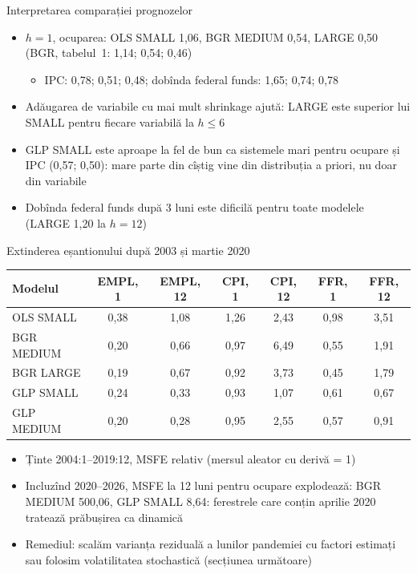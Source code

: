 \begin{frame}{Interpretarea comparației prognozelor}
\itemsize{\small}
\begin{itemize}
    \item $h = 1$, ocuparea: OLS SMALL 1{,}06, BGR MEDIUM 0{,}54, LARGE 0{,}50 (BGR, tabelul~1: 1,14; 0,54; 0,46)
    \begin{itemize}
        \item IPC: 0{,}78; 0{,}51; 0{,}48; dobînda federal funds: 1{,}65; 0{,}74; 0{,}78
    \end{itemize}
    \item Adăugarea de variabile cu mai mult shrinkage ajută: LARGE este superior lui SMALL pentru fiecare variabilă la $h \le 6$
    \item GLP SMALL este aproape la fel de bun ca sistemele mari pentru ocupare și IPC (0{,}57; 0{,}50): mare parte din cîștig vine din distribuția a priori, nu doar din variabile
    \item Dobînda federal funds după 3 luni este dificilă pentru toate modelele (LARGE 1{,}20 la $h = 12$)
\end{itemize}
\end{frame}

\begin{frame}{Extinderea eșantionului după 2003 și martie 2020}
\itemsize{\footnotesize}
\begin{center}
\scriptsize
\begin{tabular}{lcccccc}
\toprule
\textbf{Modelul} & \textbf{EMPL, 1} & \textbf{EMPL, 12} & \textbf{CPI, 1} & \textbf{CPI, 12} & \textbf{FFR, 1} & \textbf{FFR, 12} \\
\midrule
OLS SMALL & 0{,}38 & 1{,}08 & 1{,}26 & 2{,}43 & 0{,}98 & 3{,}51 \\
BGR MEDIUM & 0{,}20 & 0{,}66 & 0{,}97 & 6{,}49 & 0{,}55 & 1{,}91 \\
BGR LARGE & 0{,}19 & 0{,}67 & 0{,}92 & 3{,}73 & 0{,}45 & 1{,}79 \\
GLP SMALL & 0{,}24 & 0{,}33 & 0{,}93 & 1{,}07 & 0{,}61 & 0{,}67 \\
GLP MEDIUM & 0{,}20 & 0{,}28 & 0{,}95 & 2{,}55 & 0{,}57 & 0{,}91 \\
\bottomrule
\end{tabular}
\end{center}
\begin{itemize}
    \item Ținte 2004:1--2019:12, MSFE relativ (mersul aleator cu derivă = 1)
    \item Incluzînd 2020--2026, MSFE la 12 luni pentru ocupare explodează: BGR MEDIUM 500{,}06, GLP SMALL 8{,}64: ferestrele care conțin aprilie 2020 tratează prăbușirea ca dinamică
    \item Remediul: scalăm varianța reziduală a lunilor pandemiei cu factori estimați  sau folosim volatilitatea stochastică (secțiunea următoare)
\end{itemize}
\end{frame}

